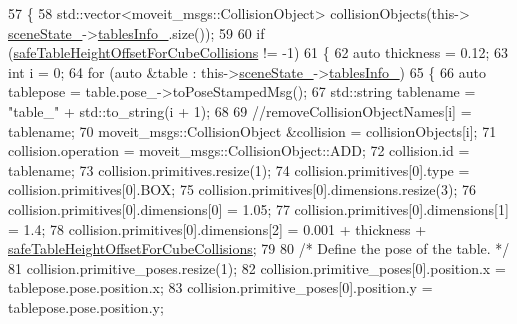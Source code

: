 \begin{DoxyCode}
57             \{
58                 std::vector<moveit\_msgs::CollisionObject> collisionObjects(this->
      \hyperlink{classsm__moveit__4_1_1cl__moveit__z__client_1_1CpConstraintTableWorkspaces_ae2d0e4852e944e8a870d5936de646d47}{sceneState\_}->\hyperlink{classsm__moveit__4_1_1cl__perception__system_1_1CpSceneState_a95f74dd16566d97e017650ccdf4b8a46}{tablesInfo\_}.size());
59 
60                 \textcolor{keywordflow}{if} (\hyperlink{classsm__moveit__4_1_1cl__moveit__z__client_1_1CpConstraintTableWorkspaces_a8c9bd78c8330ae1446e5bc4d2891e285}{safeTableHeightOffsetForCubeCollisions} != -1)
61                 \{
62                     \textcolor{keyword}{auto} thickness = 0.12;
63                     \textcolor{keywordtype}{int} i = 0;
64                     \textcolor{keywordflow}{for} (\textcolor{keyword}{auto} &table : this->\hyperlink{classsm__moveit__4_1_1cl__moveit__z__client_1_1CpConstraintTableWorkspaces_ae2d0e4852e944e8a870d5936de646d47}{sceneState\_}->\hyperlink{classsm__moveit__4_1_1cl__perception__system_1_1CpSceneState_a95f74dd16566d97e017650ccdf4b8a46}{tablesInfo\_})
65                     \{
66                         \textcolor{keyword}{auto} tablepose = table.pose\_->toPoseStampedMsg();
67                         std::string tablename = \textcolor{stringliteral}{"table\_"} + std::to\_string(i + 1);
68 
69                         \textcolor{comment}{//removeCollisionObjectNames[i] = tablename;}
70                         moveit\_msgs::CollisionObject &collision = collisionObjects[i];
71                         collision.operation = moveit\_msgs::CollisionObject::ADD;
72                         collision.id = tablename;
73                         collision.primitives.resize(1);
74                         collision.primitives[0].type = collision.primitives[0].BOX;
75                         collision.primitives[0].dimensions.resize(3);
76                         collision.primitives[0].dimensions[0] = 1.05;
77                         collision.primitives[0].dimensions[1] = 1.4;
78                         collision.primitives[0].dimensions[2] = 0.001 + thickness + 
      \hyperlink{classsm__moveit__4_1_1cl__moveit__z__client_1_1CpConstraintTableWorkspaces_a8c9bd78c8330ae1446e5bc4d2891e285}{safeTableHeightOffsetForCubeCollisions};
79 
80                         \textcolor{comment}{/* Define the pose of the table. */}
81                         collision.primitive\_poses.resize(1);
82                         collision.primitive\_poses[0].position.x = tablepose.pose.position.x;
83                         collision.primitive\_poses[0].position.y = tablepose.pose.position.y;

\end{DoxyCode}
